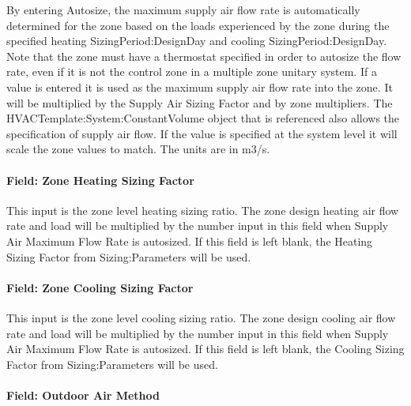 By entering Autosize, the maximum supply air flow rate is automatically determined for the zone based on the loads experienced by the zone during the specified heating SizingPeriod:DesignDay and cooling SizingPeriod:DesignDay. Note that the zone must have a thermostat specified in order to autosize the flow rate, even if it is not the control zone in a multiple zone unitary system. If a value is entered it is used as the maximum supply air flow rate into the zone. It will be multiplied by the Supply Air Sizing Factor and by zone multipliers. The HVACTemplate:System:ConstantVolume object that is referenced also allows the specification of supply air flow. If the value is specified at the system level it will scale the zone values to match. The units are in m3/s.

\paragraph{Field: Zone Heating Sizing Factor}\label{field-zone-heating-sizing-factor-10}

This input is the zone level heating sizing ratio. The zone design heating air flow rate and load will be multiplied by the number input in this field when Supply Air Maximum Flow Rate is autosized. If this field is left blank, the Heating Sizing Factor from Sizing:Parameters will be used.

\paragraph{Field: Zone Cooling Sizing Factor}\label{field-zone-cooling-sizing-factor-9}

This input is the zone level cooling sizing ratio. The zone design cooling air flow rate and load will be multiplied by the number input in this field when Supply Air Maximum Flow Rate is autosized. If this field is left blank, the Cooling Sizing Factor from Sizing:Parameters will be used.

\paragraph{Field: Outdoor Air Method}\label{field-outdoor-air-method-11}


